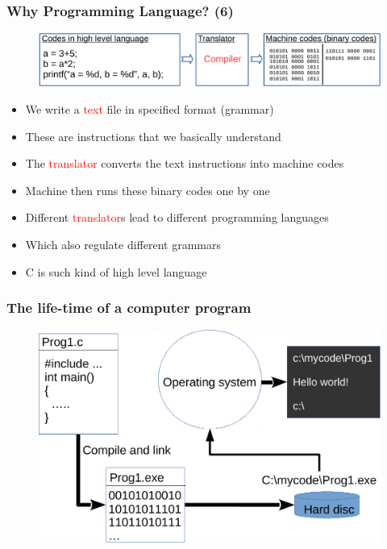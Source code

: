 \begin{frame}
	\frametitle{Why Programming Language? (6)}
\begin{figure}
	\includegraphics[width=0.95\linewidth]{figs/compil.pdf}
\end{figure}
\begin{itemize}
	\item {We write a \textcolor{red}{text} file in specified format (grammar)}
	\item {These are instructions that we basically understand}
	\item {The \textcolor{red}{translator} converts the text instructions into machine codes}
	\item {Machine then runs these binary codes one by one}
	\item {Different \textcolor{red}{translator}s lead to different programming languages}
	\item {Which also regulate different grammars}
	\item {C is such kind of high level language}
\end{itemize}
\end{frame}

\begin{frame}
	\frametitle{The life-time of a computer program}
\begin{figure}
	\includegraphics[width=0.95\linewidth]{figs/life-tm.pdf}
\end{figure}
\end{frame}